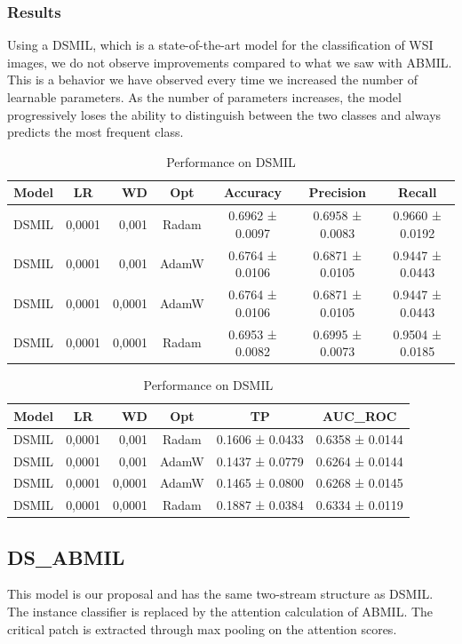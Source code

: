 \documentclass{article}
\begin{document}
\clearpage
\subsubsection{Results}
Using a DSMIL, which is a state-of-the-art model for the classification of WSI images, we do not observe improvements compared to what we saw with ABMIL. This is a behavior we have observed every time we increased the number of learnable parameters. As the number of parameters increases, the model progressively loses the ability to distinguish between the two classes and always predicts the most frequent class.

\begin{table}[h]
	\centering
	\begin{tabular}{|ccrc|c|c|c|}
		\hline
		Model & LR & WD & Opt & Accuracy & Precision & Recall \\
		\hline
		DSMIL & 0,0001 & 0,001 & Radam & 0.6962 ± 0.0097 & 0.6958 ± 0.0083 & 0.9660 ± 0.0192 \\
		DSMIL & 0,0001 & 0,001 & AdamW & 0.6764 ± 0.0106 & 0.6871 ± 0.0105 & 0.9447 ± 0.0443 \\
		DSMIL & 0,0001 & 0,0001 & AdamW & 0.6764 ± 0.0106 & 0.6871 ± 0.0105 & 0.9447 ± 0.0443 \\
		DSMIL & 0,0001 & 0,0001 & Radam & 0.6953 ± 0.0082 & 0.6995 ± 0.0073 & 0.9504 ± 0.0185 \\
		\hline
	\end{tabular}
	\centering
	\begin{tabular}{|ccrc|c|c|}
		\hline
		Model & LR & WD & Opt & TP & AUC\_ROC \\
		\hline
		DSMIL & 0,0001 & 0,001 & Radam & 0.1606 ± 0.0433 & 0.6358 ± 0.0144 \\
		DSMIL & 0,0001 & 0,001 & AdamW & 0.1437 ± 0.0779 & 0.6264 ± 0.0144 \\
		DSMIL & 0,0001 & 0,0001 & AdamW & 0.1465 ± 0.0800 & 0.6268 ± 0.0145 \\
		DSMIL & 0,0001 & 0,0001 & Radam & 0.1887 ± 0.0384 & 0.6334 ± 0.0119 \\
		\hline
	\end{tabular}

	\caption{Performance on DSMIL}
\end{table}

\clearpage

\subsection{DS\_ABMIL}
This model is our proposal and has the same two-stream structure as DSMIL. The instance classifier is replaced by the attention calculation of ABMIL. The critical patch is extracted through max pooling on the attention scores.
\end{document}

